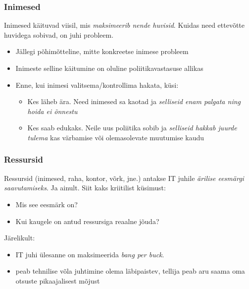 \begin{frame}[fragile]
  \frametitle{Inimesed}
  Inimesed käituvad viisil, mis \emph{maksimeerib nende huvisid}. Kuidas need ettevõtte huvidega sobivad, on juhi probleem.
	\begin{itemize}
		\item Jällegi põhimõtteline, mitte konkreetse inimese probleem
		\item Inimeste selline käitumine on oluline poliitikavastasuse allikas 
		\item Enne, kui inimesi valitsema/kontrollima hakata, küsi: 
			\begin{itemize}
				\item Kes läheb ära. Need inimesed sa kaotad ja \emph{selliseid enam palgata ning hoida ei õnnestu}
				\item Kes saab edukaks. Neile uus poliitika sobib ja \emph{selliseid hakkab juurde tulema} kas värbamise või olemasolevate muutumise kaudu
			\end{itemize}
	\end{itemize}
\end{frame}

\begin{frame}[fragile]
  \frametitle{Ressursid}
	Ressursid (inimesed, raha, kontor, võrk, jne.) antakse IT juhile \emph{ärilise eesmärgi saavutamiseks}. Ja ainult. Siit kaks kriitilist küsimust:
	\begin{itemize}
		\item Mis see eesmärk on?
		\item Kui kaugele on antud ressursiga reaalne jõuda?
	\end{itemize}

	Järelikult:
	\begin{itemize}
		\item IT juhi ülesanne on maksimeerida \emph{bang per buck}. 
		\item peab tehnilise võla juhtimine olema läbipaistev, tellija peab aru saama oma otsuste pikaajalisest mõjust
	\end{itemize}
\end{frame}


